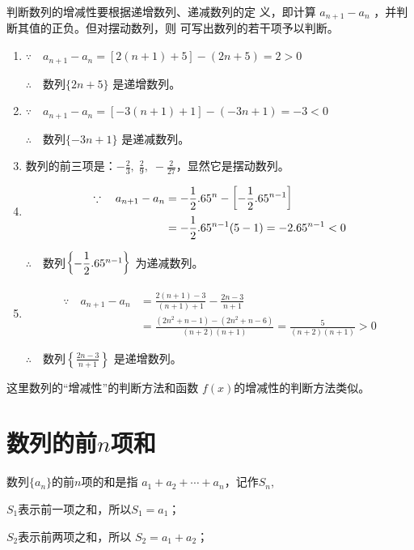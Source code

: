 \begin{solution}
判断数列的增减性要根据递增数列、递减数列的定
义，即计算
$a_{n+1}-a_n$
，并判断其值的正负。但对摆动数列，则
可写出数列的若干项予以判断。
\begin{enumerate}[(1)]
    \item $\because\quad a_{n+1}-a_n=[2(n+1)+5]-(2n+5)=2>0$
    
$\therefore\quad $数列$\{2n+5\}$
是递增数列。

\item $\because\quad a_{n+1}-a_n=[-3(n+1)+1]-(-3n+1)=-3<0$
    
$\therefore\quad $数列$\{-3n+1\}$
是递减数列。
\item 数列的前三项是：$-\frac{2}{3},\; \frac{2}{9},\; -\frac{2}{27}$，显然它是摆动数列。

\item \[\begin{split}
    \because\quad a_{n+1}-a_n&=-\dfrac{1}{2}.6 5^n-\left[-\dfrac{1}{2}.6 5^{n-1}\right]\\
    &=-\dfrac{1}{2}.6 5^{n-1}(5-1)=-2.6 5^{n-1}<0
\end{split}\]

$\therefore\quad $数列$\left\{-\dfrac{1}{2}.6 5^{n-1}\right\}$
为递减数列。

\item \[\begin{split}
    \because\quad a_{n+1}-a_n&=  \frac{2(n+1)-3}{(n+1)+1}-\frac{2n-3}{n+1}\\
    &=\frac{(2n^2+n-1)-(2n^2+n-6)}{(n+2)(n+1)}=\frac{5}{(n+2)(n+1)}>0
\end{split}\]

$\therefore\quad $数列$\left\{\frac{2n-3}{n+1}\right\}$
是递增数列。
\end{enumerate}
\end{solution}

\begin{rmk}
    这里数列的“增减性”的判断方法和函数
$f(x)$的增减性的判断方法类似。
\end{rmk}

\section{数列的前$n$项和}
数列$\{a_n\}$的前$n$项的和是指
$a_1+a_2+\cdots+a_n$，记作$S_n$,

$S_1$表示前一项之和，所以$S_1=a_1$；

$S_2$表示前两项之和，所以
$S_2=a_1+a_2$；


